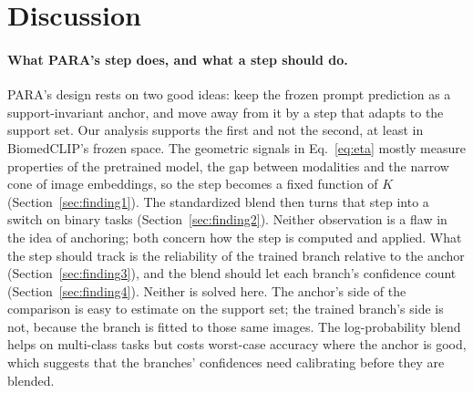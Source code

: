 \section{Discussion}\label{sec:discussion}

\paragraph{What PARA's step does, and what a step should do.}
PARA's design rests on two good ideas: keep the frozen prompt prediction as a support-invariant anchor, and move away from it by a step that adapts to the support set.
Our analysis supports the first and not the second, at least in BiomedCLIP's frozen space.
The geometric signals in Eq.~\eqref{eq:eta} mostly measure properties of the pretrained model, the gap between modalities and the narrow cone of image embeddings,
so the step becomes a fixed function of $K$ (Section~\ref{sec:finding1}).
The standardized blend then turns that step into a switch on binary tasks (Section~\ref{sec:finding2}).
Neither observation is a flaw in the idea of anchoring; both concern how the step is computed and applied.
What the step should track is the reliability of the trained branch relative to the anchor (Section~\ref{sec:finding3}),
and the blend should let each branch's confidence count (Section~\ref{sec:finding4}).
Neither is solved here.
The anchor's side of the comparison is easy to estimate on the support set; the trained branch's side is not, because the branch is fitted to those same images.
The log-probability blend helps on multi-class tasks but costs worst-case accuracy where the anchor is good, which suggests that the branches' confidences need calibrating before they are blended.

